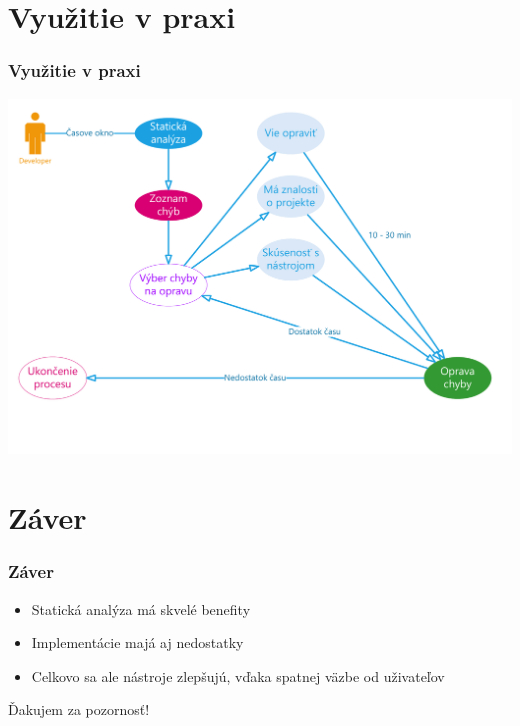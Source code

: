 \documentclass{beamer}
\begin{document}
\section{Využitie v praxi}

\begin{frame}[fragile=singleslide]\frametitle{Využitie v praxi}
	\centerline{\includegraphics[scale=0.38]{vyuzitie.pdf}}
\end{frame}


\section*{Záver}

\begin{frame}[fragile=singleslide]\frametitle{Záver}
	\begin{itemize}
		\item Statická analýza má skvelé benefity
		\item Implementácie majá aj nedostatky
		\item Celkovo sa ale nástroje zlepšujú, vďaka spatnej väzbe od uživateľov
	\end{itemize}
	\vfill
	\begin{center}
		\large{Ďakujem za pozornosť!}
	\end{center}
\end{frame}
\end{document}
